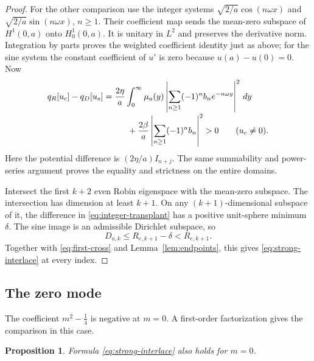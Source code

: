\documentclass[11pt]{article}
\newtheorem{proposition}[theorem]{Proposition}
\begin{document}
\begin{proof}
For the other comparison use the integer systems
$\sqrt{2/a}\cos(n\omega x)$ and $\sqrt{2/a}\sin(n\omega x)$,
$n\geq1$. Their coefficient map sends the mean-zero subspace of
$H^1(0,a)$ onto $H^1_0(0,a)$. It is unitary in $L^2$ and preserves the
derivative norm. Integration by parts proves the weighted coefficient
identity just as above; for the sine system the constant coefficient of
$u'$ is zero because $u(a)-u(0)=0$. Now
\begin{align}\label{eq:integer-transplant}
 q_R[u_c]-q_D[u_s]
 &=\frac{2\eta}{a}\int_0^\infty\mu_a(y)
       \left|\sum_{n\geq1}(-1)^n b_ne^{-n\omega y}\right|^2\,dy
 \notag\\[-2pt]
 &\hspace{1cm}+\frac{2\beta}{a}
       \left|\sum_{n\geq1}(-1)^n b_n\right|^2>0\qquad(u_c\ne0).
\end{align}
Here the potential difference is $(2\eta/a)I_{n+j}$.
The same summability and power-series argument proves the equality and
strictness on the entire domains.

Intersect the first $k+2$ even Robin eigenspace with the mean-zero
subspace. The intersection has dimension at least $k+1$. On any
$(k+1)$-dimensional subspace of it, the difference in
\eqref{eq:integer-transplant} has a positive unit-sphere minimum
$\delta$. The sine image is an admissible Dirichlet subspace, so
\[
 D_{o,k}\leq R_{e,k+1}-\delta<R_{e,k+1}.
\]
Together with \eqref{eq:first-cross} and Lemma~\ref{lem:endpoints},
this gives \eqref{eq:strong-interlace} at every index.
\end{proof}

\subsection{The zero mode}

The coefficient $m^2-\tfrac14$ is negative at $m=0$.
A first-order factorization gives the comparison in this case.

\begin{proposition}\label{prop:zero-mode}
Formula \eqref{eq:strong-interlace} also holds for $m=0$.
\end{proposition}
\end{document}
